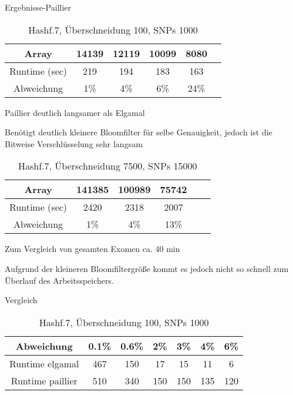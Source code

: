 \documentclass{beamer}
\begin{document}
\begin{frame}{Ergebnisse-Paillier}
	\begin{table}[h]
		
		\begin{tabular}{c|c|c|c|c|c}
			Array&14139&12119&10099&8080\\
			\hline
			Runtime (sec)&219&194&183&163\\
			Abweichung&1\%&4\%&6\%&24\%\\
			
			
		\end{tabular}
		\caption{Hashf.7, Überschneidung 100, SNPs 1000 }
		\label{tab:meinetabelle5}
	\end{table}
	
	\begin{arrowlist}
		\item Paillier deutlich langsamer als Elgamal
		\item Benötigt deutlich kleinere Bloomfilter für selbe Genauigkeit, jedoch ist die Bitweise Verschlüsselung sehr langsam
	\end{arrowlist}
\end{frame}
\begin{frame}
	\begin{table}[h]
		
		\begin{tabular}{c|c|c|c|c|c}
			Array&141385&100989&75742\\
			\hline
			Runtime (sec)&2420&2318&2007\\
			Abweichung&1\%&4\%& 13\%\\
			
			
		\end{tabular}
		\caption{Hashf.7, Überschneidung 7500, SNPs 15000 }
		\label{tab:meinetabelle6}
	\end{table}
	
	\begin{arrowlist}
		\item Zum Vergleich von gesamten Exomen ca. 40 min
		\item Aufgrund der kleineren Bloomfiltergröße kommt es jedoch nicht so schnell zum Überlauf des Arbeitsspeichers.

		
	\end{arrowlist}

\end{frame}

\begin{frame}{Vergleich}
	\begin{table}[h]
		
		\begin{tabular}{c|c|c|c|c|c|c}
			Abweichung&0.1\%&0.6\%&2\%&3\%&4\%&6\%\\
			\hline
			Runtime elgamal&467&150&17&15&11&6\\
			Runtime paillier&510&340&150&150&135&120\\
			
			
		\end{tabular}
		\caption{Hashf.7, Überschneidung 100, SNPs 1000 }
		\label{tab:meinetabelle7}
	\end{table}

	
\end{frame}
\end{document}
